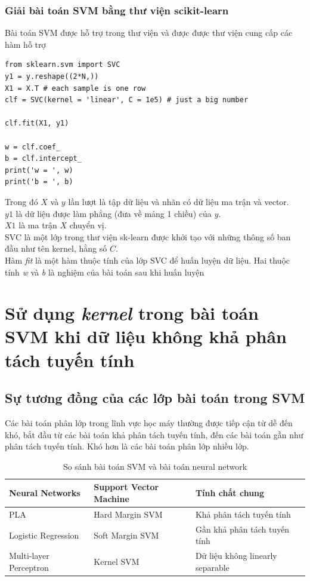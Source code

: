 \documentclass[a4paper, 12pt, oneside]{report}
\begin{document}
\subsubsection{Giải bài toán SVM bằng thư viện scikit-learn}
Bài toán SVM được hỗ trợ trong thư viện và được được thư viện cung cấp các hàm hỗ trợ
\begin{lstlisting}
from sklearn.svm import SVC
y1 = y.reshape((2*N,))
X1 = X.T # each sample is one row
clf = SVC(kernel = 'linear', C = 1e5) # just a big number 

clf.fit(X1, y1) 

w = clf.coef_
b = clf.intercept_
print('w = ', w)
print('b = ', b)
\end{lstlisting}
Trong đó $X$ và $y$ lần lượt là tập dữ liệu và nhãn có dữ liệu ma trận và vector.\\
$y1$ là dữ liệu được làm phẳng (đưa về mảng 1 chiều) của $y$.\\
$X1$ là ma trận $X$ chuyển vị.\\
SVC là một lớp trong thư viện sk-learn được khởi tạo với những thông số ban đầu như tên kernel, hằng số $C$.\\
Hàm \textit{fit} là một hàm thuộc tính của lớp SVC để huấn luyện dữ liệu. 
Hai thuộc tính \textit{w} và \textit{b} là nghiệm của bài toán sau khi huấn luyện \\



\section{Sử dụng \textit{kernel} trong bài toán SVM khi dữ liệu không khả phân tách tuyến tính}
\subsection{Sự tương đồng của các lớp bài toán trong SVM}
Các bài toán phân lớp trong lĩnh vực học máy thường được tiếp cận từ dễ đến khó, bắt đầu từ các bài toán khả phân tách tuyến tính, đến các bài toán gần như phân tách tuyến tính. Khó hơn là các bài toán phân lớp nhiều lớp.
\begin{table}
\begin{tabular}{|l|l|l|}
\hline 
Neural Networks & Support Vector Machine & Tính chất chung\\ 
\hline 
PLA & Hard Margin SVM & Khả phân tách tuyến tính\\ 
\hline 

Logistic Regression & Soft Margin SVM & Gần khả phân tách tuyến tính\\ 
\hline 
Multi-layer Perceptron & 	Kernel SVM & Dữ liệu không linearly separable\\ 
\hline
\end{tabular}
\caption{So sánh bài toán SVM và bài toán neural network}
\label{bang 2.1}
\end{table}
\end{document}
